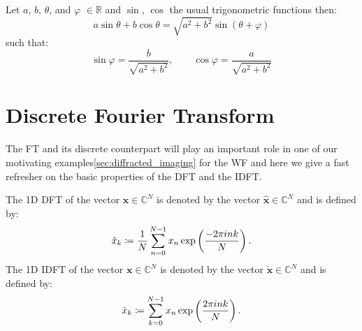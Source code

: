 	\begin{Lem}
		Let $a$, $b$, $\theta$, and $\varphi$ $\in \mathbb{R}$ and $\sin$, $\cos$ 
        the usual trigonometric functions then:
		\begin{equation}
			a\sin \theta+b\cos \theta  = \sqrt{a^2+b^2}\sin(\theta + \varphi)
		\end{equation}
		such that:
		\begin{equation}
			\sin\varphi=\frac{b}{\sqrt{a^2+b^2}}, \qquad \cos\varphi = \frac{a}{\sqrt{a^2+b^2}}
		\end{equation}
		\end{Lem}


\section{Discrete Fourier Transform}
The \ac{FT} and its discrete counterpart will play an important role in one of our motivating examples\cref{sec:diffracted_imaging} 
for the \ac{WF} and here we give a fast refresher on the basic properties of the \ac{DFT} and the \ac{IDFT}.

\begin{Def}\label{def:1ddft_1didft}
    The 1D \ac{DFT}  of the vector $\boldsymbol{x} \in \mathbb{C}^{N}$ is denoted by the vector $\hat {\boldsymbol{x}} \in \mathbb{C}^{N}$ and is defined by:
    \begin{equation}\label{eq:1ddft}
        {\hat x}_k \coloneqq \frac{1}{N}\sum_{n=0}^{N-1} x_n\exp\left({\frac{-2\pi ink}{N}}\right)\index{\ac{FT}!$1$-$d$ \ac{DFT}}.
    \end{equation}
    The 1D \ac{IDFT}  of the vector $\boldsymbol{x} \in \mathbb{C}^{N}$ is denoted by the vector $\check {\boldsymbol{x}} \in \mathbb{C}^{N}$ and is defined by:
    \begin{equation}\label{eq:1didft}
        \check {x}_k \coloneqq \sum_{k=0}^{N-1}x_{n}\exp\left({\frac{2\pi ink}{N}}\right)\index{\ac{FT}!$1$-$d$ \ac{IDFT}}.
    \end{equation}    
\end{Def}

